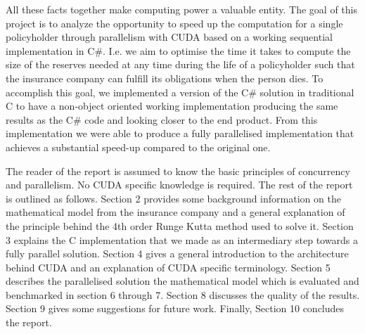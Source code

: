 All these facts together make computing power a valuable entity. The goal of this project is to analyze the opportunity to speed up the computation for a single policyholder through parallelism with CUDA based on a working sequential implementation in C\#. I.e. we aim to optimise the time it takes to compute the size of the reserves needed at any time during the life of a policyholder such that the insurance company can fulfill its obligations when the person dies. To accomplish this goal, we implemented a version of the C\# solution in traditional C to have a non-object oriented working implementation producing the same results as the C\# code and looking closer to the end product. From this implementation we were able to produce a fully parallelised implementation that achieves a substantial speed-up compared to the original one.

The reader of the report is assumed to know the basic principles of concurrency and parallelism. No CUDA specific knowledge is required. The rest of the report is outlined as follows. Section 2 provides some background information on the mathematical model from the insurance company and a general explanation of the principle behind the 4th order Runge Kutta method used to solve it. Section 3 explains the C implementation that we made as an intermediary step towards a fully parallel solution. Section 4 gives a general introduction to the architecture behind CUDA and an explanation of CUDA specific terminology. Section 5 describes the parallelised solution the mathematical model which is evaluated and benchmarked in section 6 through 7. Section 8 discusses the quality of the results. Section 9 gives some suggestions for future work. Finally, Section 10 concludes the report.